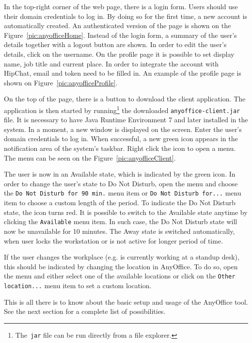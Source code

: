 \documentclass[11pt,singleside]{myfithesis2}
\begin{document}
In the top-right corner of the web page, there is a login form. Users should use their domain credentials to log in. By doing so for the first time, a new account is automatically created. An authenticated version of the page is shown on the Figure~\ref{pic:anyofficeHome}. Instead of the login form, a summary of the user's details together with a logout button are shown. In order to edit the user's details, click on the username. On the profile page it is possible to set display name, job title and current place. In order to integrate the account with HipChat, email and token need to be filled in. An example of the profile page is shown on Figure~\ref{pic:anyofficeProfile}.

On the top of the page, there is a button to download the client application. The application is then started by running\footnote{The~\texttt{jar} file can be run directly from a file explorer.} the downloaded \texttt{anyoffice-client.jar} file. It is necessary to have Java Runtime Environment 7 and later installed in the system. In a moment, a new window is displayed on the screen. Enter the user's domain credentials to log in. When successful, a new green icon appears in the notification area of the system's taskbar. Right click the icon to open a menu. The menu can be seen on the Figure~\ref{pic:anyofficeClient}.

The user is now in an Available state, which is indicated by the green icon. In order to change the user's state to Do Not Disturb, open the menu and choose the \texttt{Do Not Disturb for 90 min.} menu item or \texttt{Do Not Disturb for...} menu item to choose a custom length of the period. To indicate the Do Not Disturb state, the icon turns red. It is possible to switch to the Available state anytime by clicking the \texttt{Available} menu item. In such case, the Do Not Disturb state will now be unavailable for 10 minutes. The Away state is switched automatically, when user locks the workstation or is not active for longer period of time.

If the user changes the workplace (e.g. is currently working at a standup desk), this should be indicated by changing the location in AnyOffice. To do so, open the menu and either select one of the available locations or click on the \texttt{Other location...} menu item to set a custom location.

This is all there is to know about the basic setup and usage of the AnyOffice tool. See the next section for a complete list of possibilities.
\end{document}
